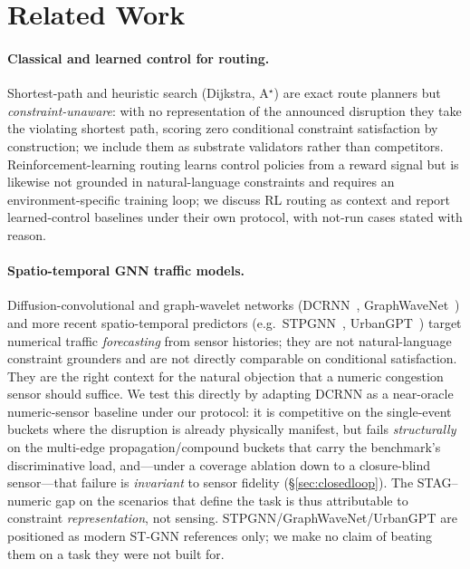 \section{Related Work}
\label{sec:related}

\paragraph{Classical and learned control for routing.}
Shortest-path and heuristic search (Dijkstra, A$^\star$) are exact route planners but
\emph{constraint-unaware}: with no representation of the announced disruption they take the violating
shortest path, scoring zero conditional constraint satisfaction by construction; we include them as
substrate validators rather than competitors. Reinforcement-learning routing learns control policies
from a reward signal but is likewise not grounded in natural-language constraints and requires an
environment-specific training loop; we discuss RL routing as context and report learned-control baselines
under their own protocol, with not-run cases stated with reason.

\paragraph{Spatio-temporal GNN traffic models.}
Diffusion-convolutional and graph-wavelet networks (DCRNN~\cite{li2018dcrnn},
GraphWaveNet~\cite{wu2019gwn}) and more recent spatio-temporal predictors (e.g.\
STPGNN~\cite{stpgnn2024}, UrbanGPT~\cite{urbangpt2024}) target numerical traffic \emph{forecasting} from
sensor histories; they are not natural-language constraint grounders and are not directly comparable on
conditional satisfaction. They are the right context for the natural objection that a numeric congestion
sensor should suffice. We test this directly by adapting DCRNN as a near-oracle numeric-sensor baseline
under our protocol: it is competitive on the single-event buckets where the disruption is already
physically manifest, but fails \emph{structurally} on the multi-edge propagation/compound buckets that
carry the benchmark's discriminative load, and---under a coverage ablation down to a closure-blind
sensor---that failure is \emph{invariant} to sensor fidelity (\S\ref{sec:closedloop}). The
STAG--numeric gap on the scenarios that define the task is thus attributable to constraint
\emph{representation}, not sensing. STPGNN/GraphWaveNet/UrbanGPT are positioned as modern ST-GNN
references only; we make no claim of beating them on a task they were not built for.

